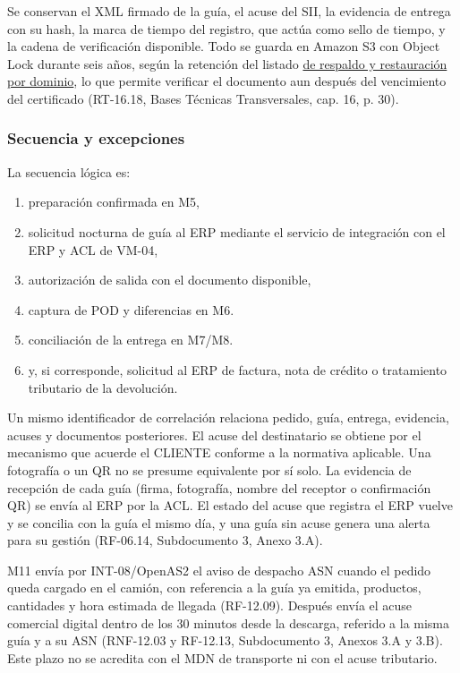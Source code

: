 Se conservan el XML firmado de la guía, el acuse del SII, la evidencia de entrega con su hash, la marca de tiempo del registro, que actúa como sello de tiempo, y la cadena de verificación disponible. Todo se guarda en Amazon S3 con Object Lock durante seis años, según la retención del listado \hyperref[tab:jd12]{de respaldo y restauración por dominio}, lo que permite verificar el documento aun después del vencimiento del certificado (RT-16.18, Bases Técnicas Transversales, cap. 16, p. 30).

\subsubsection{Secuencia y excepciones}

La secuencia lógica es:

\begin{enumerate}
  \item preparación confirmada en M5,
  \item solicitud nocturna de guía al ERP mediante el servicio de integración con el ERP y ACL de VM-04,
  \item autorización de salida con el documento disponible,
  \item captura de POD y diferencias en M6.
  \item conciliación de la entrega en M7/M8.
  \item y, si corresponde, solicitud al ERP de factura, nota de crédito o tratamiento tributario de la devolución.
\end{enumerate}

Un mismo identificador de correlación relaciona pedido, guía, entrega, evidencia, acuses y documentos posteriores. El acuse del destinatario se obtiene por el mecanismo que acuerde el CLIENTE conforme a la normativa aplicable. Una fotografía o un QR no se presume equivalente por sí solo. La evidencia de recepción de cada guía (firma, fotografía, nombre del receptor o confirmación QR) se envía al ERP por la ACL. El estado del acuse que registra el ERP vuelve y se concilia con la guía el mismo día, y una guía sin acuse genera una alerta para su gestión (RF-06.14, Subdocumento 3, Anexo 3.A).

M11 envía por INT-08/OpenAS2 el aviso de despacho ASN cuando el pedido queda cargado en el camión, con referencia a la guía ya emitida, productos, cantidades y hora estimada de llegada (RF-12.09). Después envía el acuse comercial digital dentro de los 30 minutos desde la descarga, referido a la misma guía y a su ASN (RNF-12.03 y RF-12.13, Subdocumento 3, Anexos 3.A y 3.B). Este plazo no se acredita con el MDN de transporte ni con el acuse tributario.

